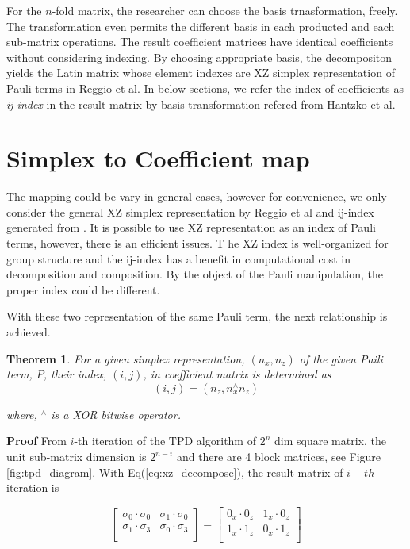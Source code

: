 \documentclass[twocolumn]{article}
\newtheorem{theorem}{Theorem}
\begin{document}
For the $n$-fold matrix, the researcher can choose the basis trnasformation, freely.
The transformation even permits the different basis in each producted and each sub-matrix
operations. The result coefficient matrices have identical coefficients without considering indexing.
By choosing appropriate basis, the decompositon yields the Latin matrix whose element indexes are XZ simplex representation
of Pauli terms in Reggio et al\cite{reggio_fast_2023}.
In below sections, we refer the index of coefficients as \textit{ij-index} in the result matrix 
by basis transformation refered from Hantzko et al.

\section{Simplex to Coefficient map}

The mapping could be vary in general cases, however for convenience, we only consider
the general XZ simplex representation by Reggio et al\cite{reggio_fast_2023} and 
ij-index generated from \cite{hantzko_tensorized_2023}.
It is possible to use XZ representation as an index of Pauli terms, 
however, there is an efficient issues.
T he XZ index is well-organized for group structure and 
the ij-index has a benefit in computational cost in decomposition and composition.
By the object of the Pauli manipulation, the proper index could be different.

With these two representation of the same Pauli term, the next relationship is achieved.

\begin{theorem}
    For a given simplex representation, $(n_x, n_z)$ of the given Paili term, $P$,
    their index, $(i, j)$, in coefficient matrix is determined as 
    $$(i, j) = (n_z, n_x^\wedge n_z)$$

    where, ${}^\wedge$ is a XOR bitwise operator. 
\end{theorem}

\textbf{Proof} 
From $i$-th iteration of the TPD algorithm of $2^n$ dim square matrix, 
the unit sub-matrix dimension is $2^{n-i}$ and there are 4 block matrices, see Figure \ref{fig:tpd_diagram}.
With Eq(\ref{eq:xz_decompose}), the result matrix of $i-th$ iteration is

\begin{equation}
    \begin{bmatrix}
        \sigma_0 \cdot \sigma_0 & \sigma_1 \cdot \sigma_0\\
        \sigma_1 \cdot \sigma_3 & \sigma_0 \cdot \sigma_3\\
    \end{bmatrix}
    = 
    \begin{bmatrix}
        0_x \cdot 0_z & 1_x \cdot 0_z\\
        1_x \cdot 1_z & 0_x \cdot 1_z\\
    \end{bmatrix}
\end{equation}
\end{document}

